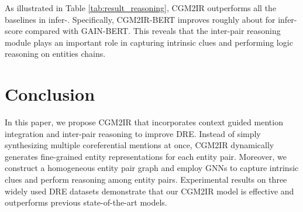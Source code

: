 \documentclass[11pt]{article}
\begin{document}
As illustrated in Table \ref{tab:result_reasoning}, CGM2IR outperforms all the baselines in infer-.
Specifically, CGM2IR-BERT improves roughly about  for infer- score compared with GAIN-BERT.
This reveals that the inter-pair reasoning module plays an important role in capturing intrinsic clues and performing logic reasoning on entities chains.
\section{Conclusion}
In this paper, we propose CGM2IR that incorporates context guided mention integration and inter-pair reasoning to improve DRE.
Instead of simply synthesizing multiple coreferential mentions at once, CGM2IR dynamically generates fine-grained entity representations for each entity pair.
Moreover, we construct a homogeneous entity pair graph and employ GNNs to capture intrinsic clues and perform reasoning among entity pairs.
Experimental results on three widely used DRE datasets demonstrate that our CGM2IR model is effective and outperforms previous state-of-the-art models.





\end{document}
